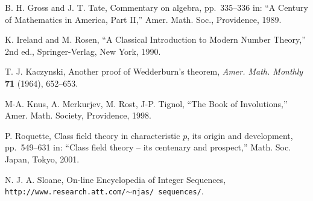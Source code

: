 \documentclass[12pt,letterpaper]{amsart}
\theoremstyle{plain}
\theoremstyle{definition}
\numberwithin{equation}{section}
\begin{document}
\begin{thebibliography}{5}

B. H. Gross and J. T. Tate, Commentary on algebra, pp.~335--336 in: 
``A Century of Mathematics in America, Part II,'' Amer. Math. Soc., 
Providence, 1989.

K. Ireland and M. Rosen, ``A Classical Introduction to Modern 
Number Theory,'' 2nd ed., Springer-Verlag, New York, 1990.

T. J. Kaczynski, Another proof of Wedderburn's theorem, 
{\it Amer. Math. Monthly} {\bf 71} (1964), 652--653.


M-A. Knus, A. Merkurjev, M. Rost, J-P. Tignol, 
``The Book of Involutions,'' Amer. Math. Society, Providence, 1998.

P. Roquette, Class field theory in characteristic $p$, its origin 
and development, pp.~549--631 in: ``Class field theory -- its centenary 
and prospect,'' Math. Soc. Japan, Tokyo, 2001.

N. J. A. Sloane, On-line Encyclopedia of Integer Sequences, 
{\tt http://www.research.att.com/$\sim$njas/ 
sequences/}.

\end{thebibliography}
\end{document}

